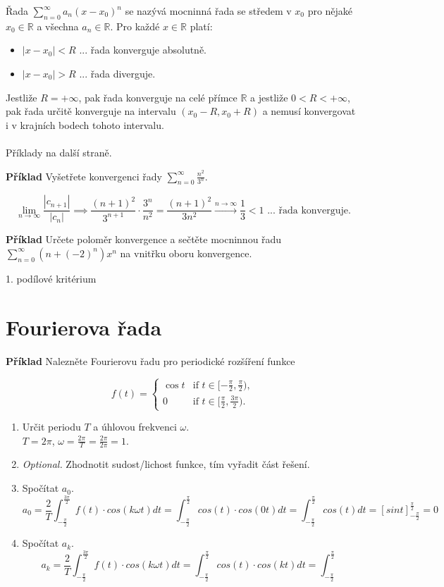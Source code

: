 \documentclass{article}
\begin{document}
Řada $\sum_{n=0}^{\infty} a_n (x-x_0)^n$ se nazývá mocninná řada se středem v $x_0$ pro nějaké $x_0 \in \mathbb{R}$ a všechna $a_n \in \mathbb{R}$. Pro každé $x \in \mathbb{R}$ platí:
\begin{itemize}
    \item $|x-x_0| < R$ ... řada konverguje absolutně.
    \item $|x-x_0| > R$ ... řada diverguje. 
\end{itemize}
Jestliže $R = + \infty$, pak řada konverguje na celé přímce $\mathbb{R}$ a jestliže $0 < R < + \infty$, pak řada určitě konverguje na intervalu $(x_0 - R, x_0 + R)$ a nemusí konvergovat i v krajních bodech tohoto intervalu.
\\ \\
Příklady na další straně.
\newpage

\textbf{Příklad} Vyšetřete konvergenci řady $\sum_{n=0}^{\infty} \frac{n^2}{3^n}$.

\[
\lim_{n \to \infty} \frac{|c_{n+1}|}{|c_n|} \implies \frac{(n+1)^2}{3^{n+1}} \cdot \frac{3^n}{n^2} = \frac{(n+1)^2}{3 n^2} \xrightarrow{n \to \infty} \frac{1}{3} < 1 \text{ ... řada konverguje.}
\] 

\textbf{Příklad} Určete poloměr konvergence a sečtěte mocninnou řadu $\sum_{n=0}^{\infty} (n + (-2)^n) x^n$ na vnitřku oboru konvergence.

1. podílové kritérium




\newpage
\section{Fourierova řada}
\textbf{Příklad} Nalezněte Fourierovu řadu pro periodické rozšíření funkce

\[
f(t) = \begin{cases} \cos t  & \text{if } t \in [- \frac{\pi}{2}, \frac{\pi}{2}), \\
                      0      & \text{if } t \in [\frac{\pi}{2}, \frac{3 \pi}{2}).      %
        \end{cases}
\]

\begin{enumerate}
    \item Určit periodu $T$ a úhlovou frekvenci $\omega$.\\
    $T=2 \pi$, $\omega = \frac{2 \pi}{T} = \frac{2 \pi}{2 \pi} = 1$.
    \item \textit{Optional.} Zhodnotit sudost/lichost funkce, tím vyřadit část řešení.
    \item Spočítat $a_0$.\\
    \[
    a_0 = \frac{2}{T} \int_{-\frac{\pi}{2}}^{\frac{3\pi}{2}} f(t) \cdot cos(k \omega t) dt = \int_{-\frac{\pi}{2}}^{\frac{\pi}{2}} cos(t) \cdot cos(0t) dt = \int_{-\frac{\pi}{2}}^{\frac{\pi}{2}} cos(t) dt = [sin t]_{-\frac{\pi}{2}}^{\frac{\pi}{2}} = 0
    \]
    \item Spočítat $a_k$.
    \[
    a_k = \frac{2}{T} \int_{-\frac{\pi}{2}}^{\frac{3\pi}{2}} f(t) \cdot cos(k \omega t) dt = \int_{-\frac{\pi}{2}}^{\frac{\pi}{2}} cos(t) \cdot cos(kt) dt = \int_{-\frac{\pi}{2}}^{\frac{\pi}{2}} 
    \]
    
\end{enumerate}
\end{document}

